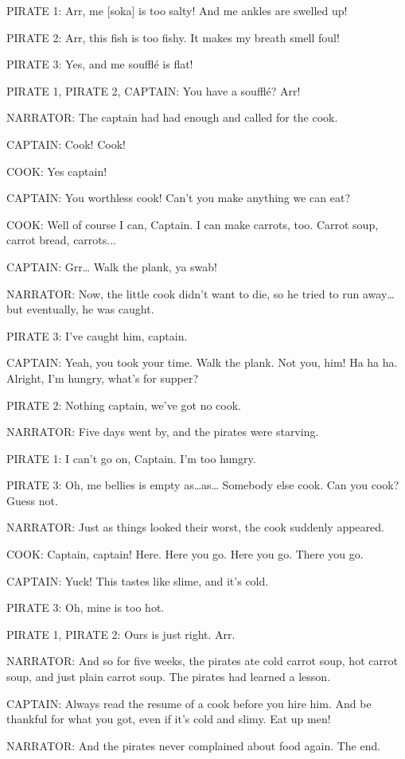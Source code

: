 PIRATE 1:
Arr, me [soka] is too salty!
And me ankles are swelled up!

PIRATE 2:
Arr, this fish is too fishy.
It makes my breath smell foul!

PIRATE 3:
Yes, and me soufflé is flat!

PIRATE 1, PIRATE 2, CAPTAIN:
You have a soufflé? Arr!

NARRATOR:
The captain had had enough and called for the cook.

CAPTAIN:
Cook! Cook!

COOK:
Yes captain!

CAPTAIN:
You worthless cook!
Can't you make anything we can eat?

COOK:
Well of course I can, Captain.
I can make carrots, too.
Carrot soup, carrot bread, carrots...

CAPTAIN:
Grr\dots
Walk the plank, ya swab!

NARRATOR:
Now, the little cook didn't want to die, so he tried to run away\dots but eventually, he was caught.

PIRATE 3:
I've caught him, captain.

CAPTAIN:
Yeah, you took your time.
Walk the plank.
Not you, him!
Ha ha ha.
Alright, I'm hungry, what's for supper?

PIRATE 2:
Nothing captain, we've got no cook.

NARRATOR:
Five days went by, and the pirates were starving.

PIRATE 1:
I can't go on, Captain.
I'm too hungry.

PIRATE 3:
Oh, me bellies is empty as\dots as\dots
Somebody else cook.
Can you cook?
Guess not.

NARRATOR:
Just as things looked their worst, the cook suddenly appeared.

COOK:
Captain, captain!
Here.
Here you go.
Here you go.
There you go.

CAPTAIN:
Yuck!
This tastes like slime, and it's cold.

PIRATE 3:
Oh, mine is too hot.

PIRATE 1, PIRATE 2:
Ours is just right.
Arr.

NARRATOR:
And so for five weeks, the pirates ate cold carrot soup, hot carrot soup, and just plain carrot soup.
The pirates had learned a lesson.

CAPTAIN:
Always read the resume of a cook before you hire him.
And be thankful for what you got, even if it's cold and slimy.
Eat up men!

NARRATOR:
And the pirates never complained about food again.
The end.

